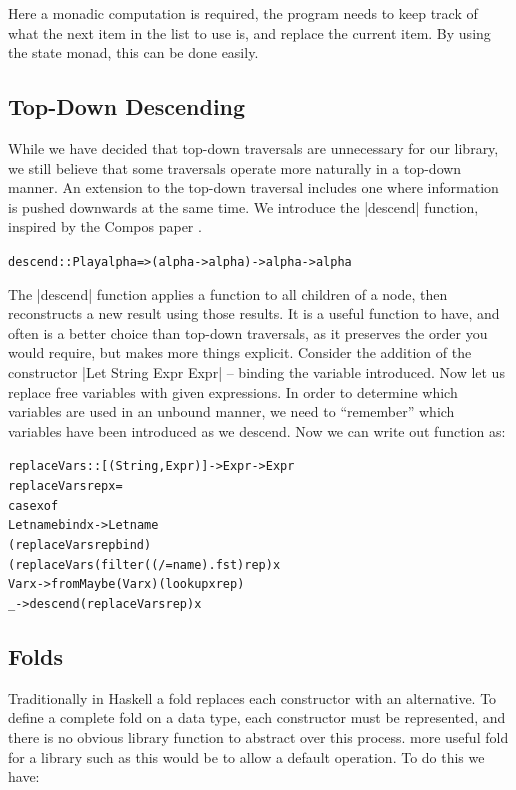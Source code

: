 \documentclass[preprint]{sigplanconf}
\newenvironment{code}{\begin{alltt}\small}{\end{alltt}}
\begin{document}
Here a monadic computation is required, the program needs to keep track of what the next item in the list to use is, and replace the current item. By using the state monad, this can be done easily.

\subsection{Top-Down Descending}

While we have decided that top-down traversals are unnecessary for our library, we still believe that some traversals operate more naturally in a top-down manner. An extension to the top-down traversal includes one where information is pushed downwards at the same time. We introduce the |descend| function, inspired by the Compos paper \cite{compos}.

\begin{code}
descend :: Play alpha => (alpha -> alpha) -> alpha -> alpha
\end{code}

The |descend| function applies a function to all children of a node, then reconstructs a new result using those results. It is a useful function to have, and often is a better choice than top-down traversals, as it preserves the order you would require, but makes more things explicit.
Consider the addition of the constructor |Let String Expr Expr| -- binding the variable introduced. Now let us replace free variables with given expressions. In order to determine which variables are used in an unbound manner, we need to ``remember'' which variables have been introduced as we descend. Now we can write out function as:

\begin{code}
replaceVars :: [(String,Expr)] -> Expr -> Expr
replaceVars rep x =
    case  x of
          Let name bind x -> Let name
              (replaceVars rep bind)
              (replaceVars (filter ((/= name) . fst) rep) x
          Var x -> fromMaybe (Var x) (lookup x rep)
          _ -> descend (replaceVars rep) x
\end{code}


\subsection{Folds}

Traditionally in Haskell a fold replaces each constructor with an alternative. To define a complete fold on a data type, each constructor must be represented, and there is no obvious library function to abstract over this process. more useful fold for a library such as this would be to allow a default operation. To do this we have:
\end{document}

